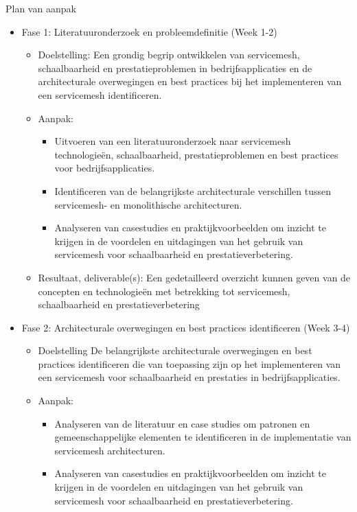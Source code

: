 Plan van aanpak
\begin{itemize}
	
	\item Fase 1: Literatuuronderzoek en probleemdefinitie (Week 1-2)
	\begin{itemize}
		\item Doelstelling: Een grondig begrip ontwikkelen van servicemesh, schaalbaarheid en prestatieproblemen in bedrijfsapplicaties en de architecturale overwegingen en best practices bij het implementeren van een servicemesh identificeren.
		\item Aanpak:
		\begin{itemize}
			\item Uitvoeren van een literatuuronderzoek naar servicemesh technologieën, schaalbaarheid, prestatieproblemen en best practices voor bedrijfsapplicaties.
			\item Identificeren van de belangrijkste architecturale verschillen tussen servicemesh- en monolithische architecturen.
			\item Analyseren van casestudies en praktijkvoorbeelden om inzicht te krijgen in de voordelen en uitdagingen van het gebruik van servicemesh voor schaalbaarheid en prestatieverbetering.
		\end{itemize}        
		\item Resultaat, deliverable(s): Een gedetailleerd overzicht kunnen geven van de concepten en technologieën met betrekking tot servicemesh, schaalbaarheid en prestatieverbetering
	\end{itemize}            
	\item Fase 2: Architecturale overwegingen en best practices identificeren (Week 3-4)
	\begin{itemize}
		\item Doelstelling De belangrijkste architecturale overwegingen en best practices identificeren die van toepassing zijn op het implementeren van een servicemesh voor schaalbaarheid en prestaties in bedrijfsapplicaties.
		\item Aanpak: 
		\begin{itemize}        
			\item Analyseren van de literatuur en case studies om patronen en gemeenschappelijke elementen te identificeren in de implementatie van servicemesh architecturen.
			\item Analyseren van casestudies en praktijkvoorbeelden om inzicht te krijgen in de voordelen en uitdagingen van het gebruik van servicemesh voor schaalbaarheid en prestatieverbetering.

\end{itemize}
\end{itemize}
\end{itemize}
